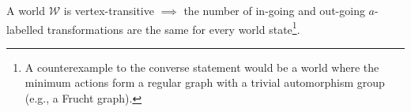 
\begin{propositionE}\label{prp:vertex_transitive_implies_num_ingoing_equals_num_outgoing}
    A world $\mathscr{W}$ is vertex-transitive $\implies$ the number of in-going and out-going $a$-labelled transformations are the same for every world state\footnote{
    A counterexample to the converse statement would be a world where the minimum actions form a regular graph with a trivial automorphism group (e.g., a Frucht graph).
    }.
\end{propositionE}
